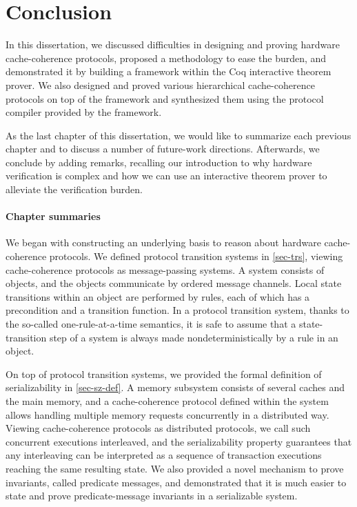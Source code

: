 \chapter*{Conclusion}

In this dissertation, we discussed difficulties in designing and proving hardware cache-coherence protocols, proposed a methodology to ease the burden, and demonstrated it by building a framework \hemiola{} within the Coq interactive theorem prover.
We also designed and proved various hierarchical cache-coherence protocols on top of the framework and synthesized them using the protocol compiler provided by the framework.

As the last chapter of this dissertation, we would like to summarize each previous chapter and to discuss a number of future-work directions.
Afterwards, we conclude by adding remarks, recalling our introduction to why hardware verification is complex and how we can use an interactive theorem prover to alleviate the verification burden.

\subsubsection{Chapter summaries}

We began with constructing an underlying basis to reason about hardware cache-coherence protocols.
We defined protocol transition systems in \autoref{sec-trs}, viewing cache-coherence protocols as message-passing systems.
A system consists of objects, and the objects communicate by ordered message channels.
Local state transitions within an object are performed by rules, each of which has a precondition and a transition function.
In a protocol transition system, thanks to the so-called one-rule-at-a-time semantics, it is safe to assume that a state-transition step of a system is always made nondeterministically by a rule in an object.

On top of protocol transition systems, we provided the formal definition of serializability in \autoref{sec-sz-def}.
A memory subsystem consists of several caches and the main memory, and a cache-coherence protocol defined within the system allows handling multiple memory requests concurrently in a distributed way.
Viewing cache-coherence protocols as distributed protocols, we call such concurrent executions interleaved, and the serializability property guarantees that any interleaving can be interpreted as a sequence of transaction executions reaching the same resulting state.
We also provided a novel mechanism to prove invariants, called predicate messages, and demonstrated that it is much easier to state and prove predicate-message invariants in a serializable system.

